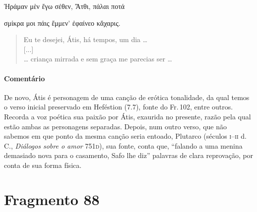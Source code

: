 \begin{gkverse}
Ἠράμαν μὲν ἔγω σέθεν, Ἄτθι, πάλαι ποτά\\

\medskip 

\hspace*{27mm}{\minion [...]}

σμίκρα μοι πάις ἔμμεν’ ἐφαίνεο κἄχαρις.
\end{gkverse}

\begin{verse}
Eu te desejei, Átis, há tempos, um dia \ldots{}\\[2mm]

\hspace*{27mm}[...]\\[2mm]

\ldots{} criança mirrada e sem graça me parecias ser \ldots{}
\end{verse}

\medskip

\paragraph{Comentário} De novo, Átis é personagem de uma canção de erótica tonalidade, da qual temos o verso inicial preservado em Heféstion (7.7), fonte do Fr.\,102, entre outros. Recorda a voz poética sua paixão por Átis, exaurida no presente, razão pela qual estão ambas as personagens separadas. Depois, num outro verso, que não sabemos em que ponto da mesma canção seria entoado, Plutarco (séculos \textsc{i}--\textsc{ii} d.\,C., \emph{Diálogos sobre o amor} 751\textsc{d}),
sua fonte, conta que, ``falando a uma menina demasiado nova para o
casamento, Safo lhe diz'' palavras de clara reprovação, por conta de sua forma
física. 




\section{Fragmento 88}

